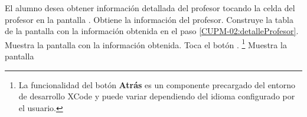  \begin{UCtrayectoria}
    \UCpaso[\UCactor] El alumno desea obtener información detallada del profesor tocando la celda del profesor en la pantalla .
    \UCpaso[\UCsist] Obtiene la información del profesor. \label{CUPM-02:detalleProfesor}
    \UCpaso[\UCsist] Construye la tabla de la pantalla  con la información obtenida en el paso \ref{CUPM-02:detalleProfesor}.
    \UCpaso[\UCsist] Muestra la pantalla  con la información obtenida.
    \UCpaso[\UCactor] Toca el botón . \footnote{La funcionalidad del botón \textbf{Atrás} es un componente precargado del entorno de desarrollo XCode y puede variar dependiendo del idioma configurado por el usuario.}
    \UCpaso[\UCsist] Muestra la pantalla 
 \end{UCtrayectoria}


 
%
%
 
